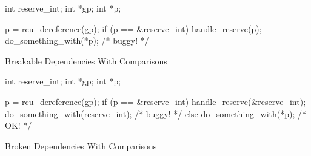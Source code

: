 \begin{listing}
\begin{fcvlabel}
\begin{VerbatimL}[commandchars=\\\[\]]
int reserve_int;
int *gp;
int *p;

p = rcu_dereference(gp);
if (p == &reserve_int)		\lnlbl[cmp]
	handle_reserve(p);	\lnlbl[handle]
do_something_with(*p); /* buggy! */
\end{VerbatimL}
\end{fcvlabel}
\caption{Breakable Dependencies With Comparisons}
\label{lst:memorder:Breakable Dependencies With Comparisons}
\end{listing}

\begin{listing}
\begin{fcvlabel}
\begin{VerbatimL}[commandchars=\\\[\]]
int reserve_int;
int *gp;
int *p;

p = rcu_dereference(gp);	\lnlbl[deref1]
if (p == &reserve_int) {
	handle_reserve(&reserve_int);
	do_something_with(reserve_int); /* buggy! */ \lnlbl[deref2]
} else {
	do_something_with(*p); /* OK! */
}
\end{VerbatimL}
\end{fcvlabel}
\caption{Broken Dependencies With Comparisons}
\label{lst:memorder:Broken Dependencies With Comparisons}
\end{listing}

